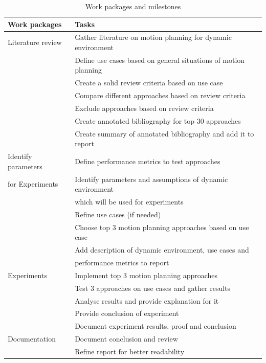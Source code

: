 \documentclass[rnd]{mas_proposal}
\begin{document}
\begin{table}[ht!]
    \centering
    \begin{tabular}{|l|l|}
        \hline
        \textbf{Work packages} & \textbf{Tasks} \\\hline
        Literature review   & Gather literature on motion planning for dynamic environment\\
                            & Define use cases based on general situations of motion planning \\
                            & Create a solid review criteria based on use case\\
                            & Compare different approaches based on review criteria\\
                            & Exclude approaches based on review criteria \\ 
                            & Create annotated bibliography for top 30 approaches\\ 
                            & Create summary of annotated bibliography and add it to report\\\hline
        Identify parameters & Define performance metrics to test approaches \\
        for Experiments     & Identify parameters and assumptions of dynamic environment\\
                            & which will be used for experiments\\
                            & Refine use cases (if needed)\\
                            & Choose top 3 motion planning approaches based on use case\\
                            & Add description of dynamic environment, use cases and \\
                            & performance metrics to report\\\hline
         Experiments        & Implement top 3 motion planning approaches\\ 
                            & Test 3 approaches on use cases and gather results \\ 
                            & Analyse results and provide explanation for it\\
                            & Provide conclusion of experiment\\
                            & Document experiment results, proof and conclusion \\\hline
        Documentation       & Document conclusion and review \\
                            & Refine report for better readability \\\hline 
    
    \end{tabular}
    \caption{Work packages and milestones\label{tab:workpackagesandmilestones}}
\end{table}
\end{document}
